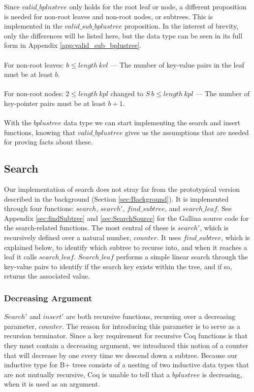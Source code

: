 Since $valid\_bplustree$ only holds for the root leaf or node, a different proposition is needed for non-root leaves and non-root nodes, or subtrees. This is implemented in the $valid\_sub\_bplustree$ proposition. In the interest of brevity, only the differences will be listed here, but the data type can be seen in its full form in Appendix \ref{app:valid_sub_bplustree}.

\paragraph{}
For non-root leaves: $b \leq length\ kvl$ --- The number of key-value pairs in the leaf must be at least $b$.

\paragraph{}
For non-root nodes: $2 \leq length\ kpl$ changed to $S\ b \leq length\ kpl$ --- The number of key-pointer pairs must be at least $b+1$.

\paragraph{}
With the $bplustree$ data type we can start implementing the search and insert functions, knowing that $valid\_bplustree$ gives us the assumptions that are needed for proving facts about these.

\subsection{Search}
\label{subsec:search}
Our implementation of search does not stray far from the prototypical version described in the background (Section \ref{sec:Background}). It is implemented through four functions: $search$, $search'$, $find\_subtree$, and $search\_leaf$. See Appendix \ref{sec:findSubtree} and \ref{sec:SearchSource} for the Gallina source code for the search-related functions. The most central of these is $search'$, which is recursively defined over a natural number, $counter$. It uses $find\_subtree$, which is explained below, to identify which subtree to recurse into, and when it reaches a leaf it calls $search\_leaf$. $Search\_leaf$ performs a simple linear search through the key-value pairs to identify if the search key exists within the tree, and if so, returns the associated value. 

\subsubsection{Decreasing Argument}
$Search'$ and $insert'$ are both recursive functions, recursing over a decreasing parameter, $counter$. The reason for introducing this parameter is to serve as a recursion terminator. Since a key requirement for recursive Coq functions is that they must contain a decreasing argument, we introduced this notion of a counter that will decrease by one every time we descend down a subtree. Because our inductive type for B+ trees consists of a nesting of two inductive data types that are not mutually recursive, Coq is unable to tell that a $bplustree$ is decreasing, when it is used as an argument. 
